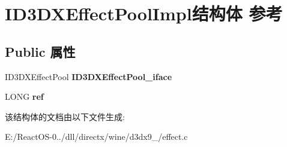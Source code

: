 \hypertarget{struct_i_d3_d_x_effect_pool_impl}{}\section{I\+D3\+D\+X\+Effect\+Pool\+Impl结构体 参考}
\label{struct_i_d3_d_x_effect_pool_impl}
\subsection*{Public 属性}
\begin{DoxyCompactItemize}
\item 
\mbox{\label{struct_i_d3_d_x_effect_pool_impl_a8dce5007e7d1dab804c1cd277744db31}} 
I\+D3\+D\+X\+Effect\+Pool {\bfseries I\+D3\+D\+X\+Effect\+Pool\+\_\+iface}
\item 
\mbox{\label{struct_i_d3_d_x_effect_pool_impl_a3e796d1ef8d76845d62cc3b756ede414}} 
L\+O\+NG {\bfseries ref}
\end{DoxyCompactItemize}


该结构体的文档由以下文件生成\+:\begin{DoxyCompactItemize}
\item 
E\+:/\+React\+O\+S-\/0../dll/directx/wine/d3dx9\+\_/effect.\+c\end{DoxyCompactItemize}
